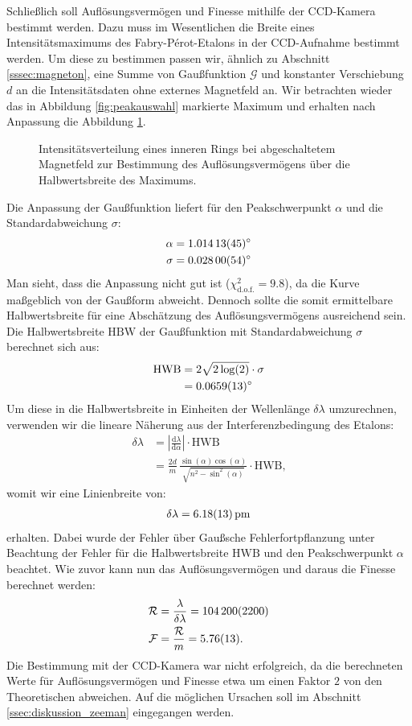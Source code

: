 \documentclass[11pt, a4paper]{article}
\begin{document}
Schließlich soll Auflösungsvermögen und Finesse mithilfe der CCD-Kamera bestimmt werden.
Dazu muss im Wesentlichen die Breite eines Intensitätsmaximums des Fabry-Pérot-Etalons in der CCD-Aufnahme bestimmt werden.
Um diese zu bestimmen passen wir, ähnlich zu Abschnitt \ref{sssec:magneton}, eine Summe von Gaußfunktion $\mathcal{G}$ und konstanter Verschiebung $d$ an die Intensitätsdaten ohne externes Magnetfeld an.
Wir betrachten wieder das in Abbildung \ref{fig:peakauswahl} markierte Maximum und erhalten nach Anpassung die Abbildung \ref{fig:gauss0}.
\begin{figure}[h]
	\centering
	
	\caption{Intensitätsverteilung eines inneren Rings bei abgeschaltetem Magnetfeld zur Bestimmung des Auflösungsvermögens über die Halbwertsbreite des Maximums.}
	\label{fig:gauss0}
\end{figure}
Die Anpassung der Gaußfunktion liefert für den Peakschwerpunkt $\alpha$ und die Standardabweichung $\sigma$:
\begin{align*}
	\alpha &= \SI{1.01413 +- 0.00045}{\degree}\\
	\sigma &= \SI{0.02800 +- 0.00054}{\degree}
\end{align*}
Man sieht, dass die Anpassung nicht gut ist ($\chi^2_\mathrm{d.o.f.} = 9.8$), da die Kurve maßgeblich von der Gaußform abweicht.
Dennoch sollte die somit ermittelbare Halbwertsbreite für eine Abschätzung des Auflösungsvermögens ausreichend sein.
Die Halbwertsbreite $\mathrm{HBW}$ der Gaußfunktion mit Standardabweichung $\sigma$ berechnet sich aus:
\begin{align*}
\mathrm{HWB} &= 2 \sqrt{2\log(2)} \cdot \sigma\\
 &= \SI{0.0659 +- 0.0013}{\degree}
\end{align*}
Um diese in die Halbwertsbreite in Einheiten der Wellenlänge $\delta \lambda$ umzurechnen, verwenden wir die lineare Näherung aus der Interferenzbedingung des Etalons:
\begin{align*}
	\delta \lambda &= \left| \frac{\mathrm{d}\lambda}{\mathrm{d}\alpha} \right| \cdot \mathrm{HWB} \\
	 &= \frac{2d}{m} \, \frac{\sin(\alpha) \cos(\alpha)}{\sqrt{n^2-\sin^2(\alpha)}} \cdot \mathrm{HWB}\text{,}
\end{align*}
womit wir eine Linienbreite von:
\begin{align*}
	\delta \lambda = \SI{6.18 +- 0.13}{\pico\metre}
\end{align*}
erhalten.
Dabei wurde der Fehler über Gaußsche Fehlerfortpflanzung unter Beachtung der Fehler für die Halbwertsbreite $\mathrm{HWB}$ und den Peakschwerpunkt $\alpha$ beachtet.
Wie zuvor kann nun das Auflösungsvermögen und daraus die Finesse berechnet werden:
\begin{align}
	\mathcal{R} &= \frac{\lambda}{\delta \lambda} = \num{104200 +- 2200} \\
	\mathcal{F} &= \frac{\mathcal{R}}{m} = \num{5.76 +- 0.13}\text{.}
\end{align}
Die Bestimmung mit der CCD-Kamera war nicht erfolgreich, da die berechneten Werte für Auflösungsvermögen und Finesse etwa um einen Faktor $2$ von den Theoretischen abweichen.
Auf die möglichen Ursachen soll im Abschnitt \ref{ssec:diskussion_zeeman} eingegangen werden.
\end{document}
